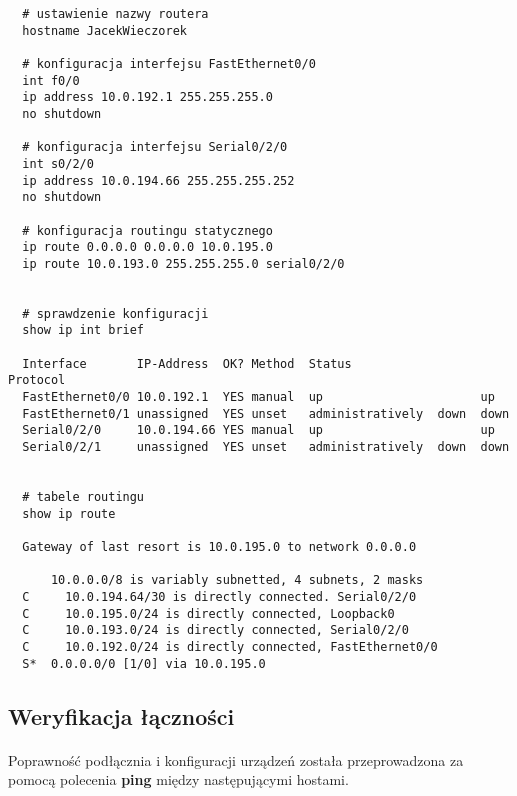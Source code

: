\documentclass[wide,a4paper,titlepage,12pt] {article}
\begin{document}
  \begin{verbatim}
  # ustawienie nazwy routera
  hostname JacekWieczorek

  # konfiguracja interfejsu FastEthernet0/0
  int f0/0
  ip address 10.0.192.1 255.255.255.0
  no shutdown

  # konfiguracja interfejsu Serial0/2/0
  int s0/2/0
  ip address 10.0.194.66 255.255.255.252
  no shutdown

  # konfiguracja routingu statycznego
  ip route 0.0.0.0 0.0.0.0 10.0.195.0
  ip route 10.0.193.0 255.255.255.0 serial0/2/0


  # sprawdzenie konfiguracji
  show ip int brief

  Interface       IP-Address  OK? Method  Status                  Protocol
  FastEthernet0/0 10.0.192.1  YES manual  up                      up
  FastEthernet0/1 unassigned  YES unset   administratively  down  down
  Serial0/2/0     10.0.194.66 YES manual  up                      up
  Serial0/2/1     unassigned  YES unset   administratively  down  down


  # tabele routingu
  show ip route

  Gateway of last resort is 10.0.195.0 to network 0.0.0.0

      10.0.0.0/8 is variably subnetted, 4 subnets, 2 masks
  C     10.0.194.64/30 is directly connected. Serial0/2/0
  C     10.0.195.0/24 is directly connected, Loopback0
  C     10.0.193.0/24 is directly connected, Serial0/2/0
  C     10.0.192.0/24 is directly connected, FastEthernet0/0
  S*  0.0.0.0/0 [1/0] via 10.0.195.0
  \end{verbatim}



  \subsection{Weryfikacja łączności}
  \paragraph{}
  Poprawność podłącznia i konfiguracji urządzeń została przeprowadzona za pomocą polecenia \textbf{ping} między następującymi hostami.
\end{document}

